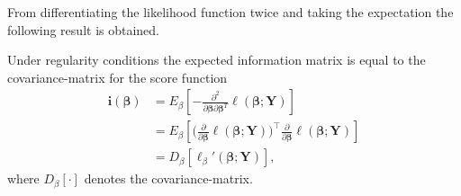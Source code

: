 From differentiating the likelihood function twice and taking the expectation the following result is obtained.

\begin{lemma}
\label{lem:fisher_information_matrix}
Under regularity conditions the expected information matrix is equal to the covariance-matrix for the score function
\begin{align*}
    \textbf{i}(\boldsymbol{\beta}) &= E_{\beta}\left[- \frac{\partial^2}{\partial \boldsymbol{\beta} \partial \boldsymbol{\beta}^T} \ell(\boldsymbol{\beta}; \textbf{Y})\right] \\
    &= E_{\beta}\left[ \bigg( \frac{\partial}{\partial \boldsymbol{\beta}}\ell(\boldsymbol{\beta};\textbf{Y}) \bigg)^\top \frac{\partial}{\partial \boldsymbol{\beta}}\ell(\boldsymbol{\beta};\textbf{Y})\right] \\
    &= D_{\beta} [\ell_\beta ' (\boldsymbol{\beta}; \textbf{Y})],
\end{align*}
where $D_\beta[\cdot]$ denotes the covariance-matrix. 
\end{lemma}

